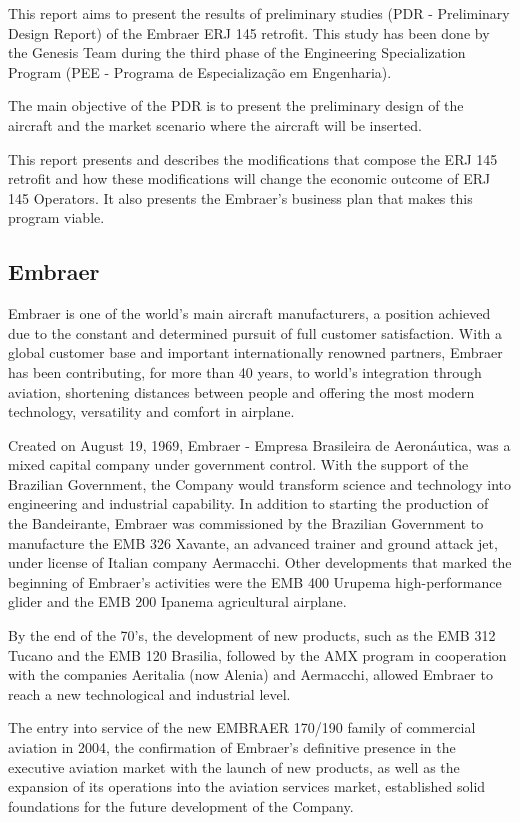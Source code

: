 
This report aims to present the results of preliminary studies (PDR - Preliminary Design Report) of the Embraer ERJ 145 retrofit. This study has been done by the Genesis Team during the third phase of the Engineering Specialization Program (PEE - Programa de Especializa\c c\~ ao em Engenharia).

The main objective of the PDR is to present the preliminary design of the aircraft and the market scenario where the aircraft will be inserted.

This report presents and describes the modifications that compose the ERJ 145 retrofit and how these modifications will change the economic outcome of ERJ 145 Operators. It also presents the Embraer's business plan that makes this program viable.

\subsection{Embraer}
Embraer is one of the world's main aircraft manufacturers, a position achieved due to the constant and determined pursuit of full customer satisfaction. With a global customer base and important internationally renowned partners, Embraer has been contributing, for more than 40 years, to world's integration through aviation, shortening distances between people and offering the most modern technology, versatility and comfort in airplane.

Created on August 19, 1969, Embraer - Empresa Brasileira de Aeronáutica, was a mixed capital company under government control. With the support of the Brazilian Government, the Company would transform science and technology into engineering and industrial capability. In addition to starting the production of the Bandeirante, Embraer was commissioned by the Brazilian Government to manufacture the EMB 326 Xavante, an advanced trainer and ground attack jet, under license of Italian company Aermacchi. Other developments that marked the beginning of Embraer's activities were the EMB 400 Urupema high-performance glider and the EMB 200 Ipanema agricultural airplane.

By the end of the 70's, the development of new products, such as the EMB 312 Tucano and the EMB 120 Brasilia, followed by the AMX program in cooperation with the companies Aeritalia (now Alenia) and Aermacchi, allowed Embraer to reach a new technological and industrial level.

The entry into service of the new EMBRAER 170/190 family of commercial aviation in 2004, the confirmation of Embraer's definitive presence in the executive aviation market with the launch of new products, as well as the expansion of its operations into the aviation services market, established solid foundations for the future development of the Company.

